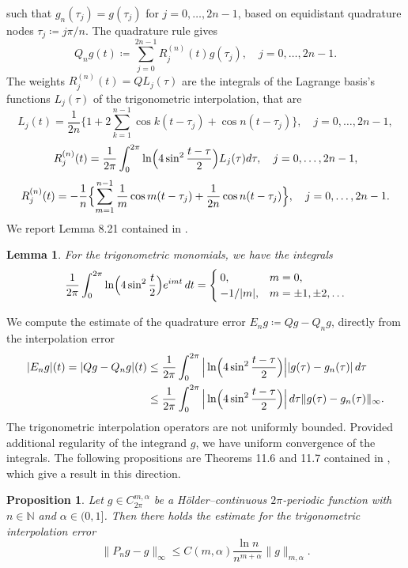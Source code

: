 \documentclass[10pt, a4paper, twoside, openright]{book}
\theoremstyle{definition}
\theoremstyle{plain}
\theoremstyle{plain}
\theoremstyle{plain}
\newtheorem{proposition}[subsection]{Proposition}
\theoremstyle{plain}
\theoremstyle{plain}
\newtheorem{lemma}[subsection]{Lemma}
\theoremstyle{plain}
\theoremstyle{plain}
\theoremstyle{plain}
\begin{document}
such that $g_n(\tau_j) = g(\tau_j)$ for $j=0,\dots,2n-1$, based on equidistant quadrature nodes $\tau_j\coloneqq j\pi/n$. 
The quadrature rule gives
\begin{equation}
 Q_ng(t)\coloneqq \sum_{j=0}^{2n-1}R_j^{(n)}(t)g(\tau_j),\quad j=0,\dots, 2n-1.
\end{equation}
The weights $R_j^{(n)}(t)=QL_j(\tau)$ are the integrals of the Lagrange basis's functions $L_j(\tau)$ of the trigonometric interpolation, that are
\begin{equation}
 L_j(t)=\frac{1}{2n}\Big\{1+2\sum_{k=1}^{n-1}\cos k(t- \tau_j) + \cos n(t - \tau_j)\Big\},\quad j=0,\dots,2n-1,
\end{equation}
\begin{equation}
 R_j^{(n)}(t)=\frac{1}{2\pi}\int_0^{2\pi}\ln\Bigl(4\sin^2\frac{t-\tau}{2}\Bigr)L_j(\tau)d\tau, \quad j=0,\dots,2n-1,
\end{equation}
\begin{equation}
 R_j^{(n)}(t)=-\frac{1}{n}\Bigl\{\sum_{m=1}^{n-1}\frac{1}{m}\cos m(t-\tau_j) + \frac{1}{2n}\cos n(t-\tau_j)\Bigr\}, \quad j=0,\dots,2n-1.
\end{equation}
We report Lemma 8.21 contained in \cite{kress:book}.
\begin{lemma}
For the trigonometric monomials, we have the integrals
\begin{equation}
 \frac{1}{2\pi}\int_0^{2\pi}\ln\Bigl(4\sin^2\frac{t}{2}\Bigr)e^{imt}\,dt=
 \begin{cases}
  0, & m=0, \\
  -1/|m|, & m=\pm1,\pm2,\dots
 \end{cases}
\end{equation}
\end{lemma}
We compute the estimate of the quadrature error $E_ng\coloneqq Qg - Q_ng$, directly from the interpolation error
\begin{align}
 |E_ng|(t)=|Qg-Q_ng|(t)&\leq\frac{1}{2\pi}\int_0^{2\pi}\Big|\ln\Bigl(4\sin^2\frac{t-\tau}{2}\Bigr)\Big||g(\tau)-g_n(\tau)|\,d\tau \\
 &\leq \frac{1}{2\pi} \int_0^{2\pi}\Big|\ln\Bigl(4\sin^2\frac{t-\tau}{2}\Bigr)\Big|\,d\tau\|g(\tau) - g_n(\tau)\|_{\infty}.
\end{align}
The trigonometric interpolation operators are not uniformly bounded.
Provided additional regularity of the integrand $g$, we have uniform convergence of the integrals. 
The following propositions are Theorems 11.6 and 11.7 contained in \cite{kress:book}, which give 
a result in this direction.
\begin{proposition}
 Let $g\in C^{m,\alpha}_{2\pi}$ be a H\"{o}lder--continuous $2\pi$-periodic function with $n\in\mathbb{N}$ and $\alpha\in(0,1]$. Then there holds the estimate for the trigonometric interpolation error
 \begin{equation}
  \|P_ng - g\|_{\infty}\leq C(m,\alpha)\frac{\ln n}{n^{m+\alpha}}\|g\|_{m,\alpha}.
 \end{equation}
\end{proposition}
\end{document}
